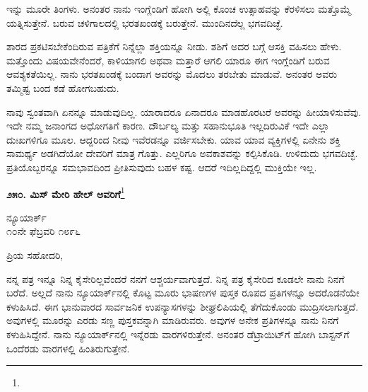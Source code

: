 ಇನ್ನು ಮೂರೇ ತಿಂಗಳು. ಅನಂತರ ನಾನು ಇಂಗ್ಲೆಂಡಿಗೆ ಹೋಗಿ ಅಲ್ಲಿ ಕೊಂಚ ಉತ್ಸಾಹವನ್ನು ಕೆರಳಿಸಲು ಮತ್ತೊಮ್ಮೆ ಯತ್ನಿಸುತ್ತೇನೆ. ಬರುವ ಚಳಿಗಾಲದಲ್ಲಿ ಭರತಖಂಡಕ್ಕೆ ಬರುತ್ತೇನೆ. ಮುಂದಿನದೆಲ್ಲ ಭಗವದಿಚ್ಛೆ.

ಶಾರದ ಪ್ರಕಟಿಸಬೇಕೆಂದಿರುವ ಪತ್ರಿಕೆಗೆ ನಿನ್ನೆಲ್ಲಾ ಶಕ್ತಿಯನ್ನೂ ನೀಡು. ಶಶಿಗೆ ಅದರ ಬಗ್ಗೆ ಆಸಕ್ತಿ ವಹಿಸಲು ಹೇಳು. ಮತ್ತೊಂದು ವಿಷಯವೇನೆಂದರೆ, ಕಾಳಿಯಾಗಲಿ ಅಥವಾ ಮತ್ತಾರೆ ಆಗಲಿ ಯಾರೂ ಈಗ ಇಂಗ್ಲೆಂಡಿಗೆ ಬರುವ ಆವಶ್ಯಕತೆಯಿಲ್ಲ. ನಾನು ಭರತಖಂಡಕ್ಕೆ ಬಂದಾಗ ಅವರನ್ನು ಮೊದಲು ತರಬೇತು ಮಾಡುವೆ. ಅನಂತರ ಅವರು ತಮ್ಮಿಷ್ಟ ಬಂದ ಕಡೆ ಹೋಗಬಹುದು.

ನಾವು ಸ್ವಂತವಾಗಿ ಏನನ್ನೂ ಮಾಡುವುದಿಲ್ಲ. ಯಾರಾದರೂ ಏನಾದರೂ ಮಾಡಹೊರಟರೆ ಅವರನ್ನು ಹೀಯಾಳಿಸುವೆವು. ಇದೇ ನಮ್ಮ ಜನಾಂಗದ ಅಧೋಗತಿಗೆ ಕಾರಣ. ದೌರ್ಬಲ್ಯ ಮತ್ತು ಸಹಾನುಭೂತಿ ಇಲ್ಲದಿರುವಿಕೆ ಇದೇ ಎಲ್ಲಾ ದುಃಖಗಳಿಗೂ ಮೂಲ. ಆದ್ದರಿಂದ ನೀವು ಇವೆರಡನ್ನೂ ವರ್ಜಿಸಬೇಕು. ಯಾವ ಯಾವ ವ್ಯಕ್ತಿಗಳಲ್ಲಿ ಏನೇನು ಶಕ್ತಿ ಸಾಮರ್ಥ್ಯ ಅಡಗಿದೆಯೋ ದೇವರಿಗೆ ಮಾತ್ರ ಗೊತ್ತು. ಎಲ್ಲರಿಗೂ ಅವಕಾಶವನ್ನು ಕಲ್ಪಿಸಿಕೊಡಿ. ಉಳಿದುದು ಭಗವದಿಚ್ಛೆ. ಪ್ರತಿಯೊಬ್ಬರನ್ನೂ ಸಮಭಾವದಿಂದ ಪ್ರೀತಿಸುವುದು ಬಹಳ ಕಷ್ಟ. ಆದರೆ ಇದಿಲ್ಲದಿದ್ದಲ್ಲಿ ಮುಕ್ತಿಯೇ ಇಲ್ಲ.

\begin{center}
\textbf{೨೫೦. ಮಿಸ್ ಮೇರಿ ಹೇಲ್ ಅವರಿಗೆ}\footnote{}
\end{center}
\vspace{-0.5cm}

\begin{flushright}
ನ್ಯೂಯಾರ್ಕ್\\೧೦ನೇ ಫೆಬ್ರವರಿ ೧೮೯೬
\end{flushright}
\vspace{-0.5cm}

\noindent
ಪ್ರಿಯ ಸಹೋದರಿ,

ನನ್ನ ಪತ್ರ ಇನ್ನೂ ನಿನ್ನ ಕೈಸೇರಿಲ್ಲವೆಂದರೆ ನನಗೆ ಆಶ್ಚರ್ಯವಾಗುತ್ತದೆ. ನಿನ್ನ ಪತ್ರ ಕೈಸೇರಿದ ಕೂಡಲೇ ನಾನು ನಿನಗೆ ಬರೆದೆ. ಅಲ್ಲದೆ ನಾನು ನ್ಯೂಯಾರ್ಕ್‌ನಲ್ಲಿ ಕೊಟ್ಟ ಮೂರು ಭಾಷಣಗಳ ಪುಸ್ತಕ ರೂಪದ ಪ್ರತಿಗಳನ್ನೂ ಅದರೊಡನೆಯೇ ಕಳುಹಿಸಿದೆ. ಈಗ ಭಾನುವಾರದ ಸಾರ್ವಜನಿಕ ಉಪನ್ಯಾಸಗಳನ್ನು ಶೀಘ್ರಲಿಪಿಯಲ್ಲಿ ತೆಗೆದುಕೊಂಡು ಮುದ್ರಿಸಲಾಗುತ್ತದೆ. ಅವುಗಳಲ್ಲಿ ಮೂರನ್ನು ಎರಡು ಸಣ್ಣ ಪುಸ್ತಕವನ್ನಾಗಿ ಮಾಡಿರುವರು. ಅವುಗಳ ಅನೇಕ ಪ್ರತಿಗಳನ್ನೂ ನಾನು ನಿನಗೆ ಕಳುಹಿಸಿದ್ದೇನೆ. ನಾನು ನ್ಯೂಯಾರ್ಕ್‌ನಲ್ಲಿ ಇನ್ನೆರಡು ವಾರಗಳಿರುತ್ತೇನೆ. ಅನಂತರ ಡೆಟ್ರಾಯಿಟ್‌ಗೆ ಹೋಗಿ ಬಾಸ್ಟನ್‌ಗೆ ಒಂದೆರಡು ವಾರಗಳಲ್ಲಿ ಹಿಂತಿರುಗುತ್ತೇನೆ.

{\fontsize{12.5}{12}\selectfont{
ಈ ವರುಷ ನನ್ನ ಆರೋಗ್ಯ ಅವಿಶ್ರಾಂತವಾದ ಕೆಲಸದಿಂದ ಬಹಳ ಕೆಟ್ಟುಹೋಗಿದೆ. ನರಗಳೆಲ್ಲಾ ಬಹಳ ದುರ್ಬಲವಾಗಿವೆ. ಈ ಚಳಿಗಾಲದಲ್ಲಿ ಒಂದು ರಾತ್ರಿಯಾದರೂ ನಾನು ಚೆನ್ನಾಗಿ ನಿದ್ರಿಸಲಿಲ್ಲ. ನಾನು ಮಿತಿಮೀರಿ ಕೆಲಸ ಮಾಡುತಿದ್ದೇನೆಂಬುದನ್ನು ಚೆನ್ನಾಗಿ ಬಲ್ಲೆ. ಆದರೂ ಇಂಗ್ಲೆಂಡಿನಲ್ಲಿ ನನಗಾಗಿ ಮಹತ್ತರವಾದ ಕೆಲಸಗಳು ಕಾದಿವೆ. ನಾನು ಅದನ್ನು ನಿರ್ವಹಿಸಲೇಬೇಕು. ಅದಾದನಂತರ ನಾನು ಭರತಖಂಡಕ್ಕೆ ಹಿಂತಿರುಗಿ ನನ್ನ ಉಳಿದ ಜೀವಮಾನವನ್ನೆಲ್ಲಾ ವಿಶ್ರಾಂತಿಯಲ್ಲಿ ಕಳೆಯಬೇಕೆಂದಿದ್ದೇನೆ. ಕಡೆಯಪಕ್ಷ ನಾನು ಜಗತ್ತಿಗೊಸ್ಕರ ನನ್ನ ಶಕ್ತಿ ಮೀರಿ ದುಡಿಯಲು ಪ್ರಯತ್ನಿಸಿ ಅದರ ಫಲವನ್ನು ಭಗವಂತನಿಗೇ ಬಿಡಬೇಕೆಂದಿದ್ದೇನೆ. ಈಗ ನಾನು ವಿಶ್ರಾಂತಿಗಾಗಿ ಹಾತೊರೆಯುತ್ತಿದ್ದೇನೆ. ಸ್ವಲ್ಪವಾದರೂ ವಿಶ್ರಾಂತಿ ಸಿಗುವುದೆಂದೂ, ಭಾರತೀಯರು ನನ್ನನ್ನು ಬಿಟ್ಟುಕೊಡುವರೆಂದೂ ಭಾವಿಸಿದ್ದೇನೆ. ನಾನು ಕೆಲವು ವರ್ಷಗಳು ಮಾತನ್ನೇ ಆಡದೆ ಮೂಕನಾಗಿರಬೇಕೆಂದು ಎಷ್ಟು ಇಚ್ಚಿಸುತ್ತಿದ್ದೇನೆ!}}

